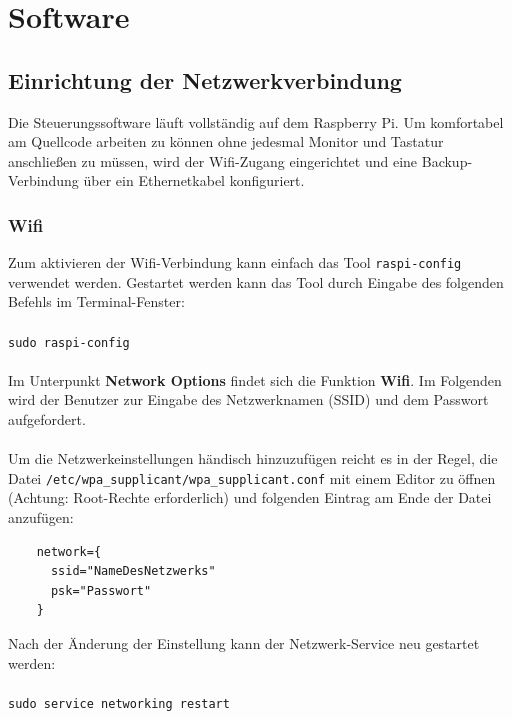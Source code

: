 \section{Software}
  \subsection{Einrichtung der Netzwerkverbindung}
  Die Steuerungssoftware läuft vollständig auf dem Raspberry Pi. Um komfortabel
  am Quellcode arbeiten zu können ohne jedesmal Monitor und Tastatur anschließen
  zu müssen, wird der Wifi-Zugang eingerichtet und eine Backup-Verbindung über
  ein Ethernetkabel konfiguriert. \\

  \subsubsection{Wifi}
    Zum aktivieren der Wifi-Verbindung
    kann einfach das Tool \texttt{raspi-config} verwendet werden. Gestartet
    werden kann das Tool durch Eingabe des folgenden Befehls im
    Terminal-Fenster: \\
    \ \\
    \texttt{sudo raspi-config} \\
    \ \\
    Im Unterpunkt \textbf{Network Options} findet sich die Funktion
    \textbf{Wifi}. Im Folgenden wird der Benutzer zur Eingabe des Netzwerknamen
    (SSID) und dem Passwort aufgefordert. \\
    \ \\
    Um die Netzwerkeinstellungen händisch hinzuzufügen reicht es in der Regel, die
    Datei \texttt{/etc/wpa\_supplicant/wpa\_supplicant.conf} mit einem Editor zu
    öffnen (Achtung: Root-Rechte erforderlich) und folgenden Eintrag am Ende der
    Datei anzufügen:

    \begin{lstlisting}
    network={
      ssid="NameDesNetzwerks"
      psk="Passwort"
    }
    \end{lstlisting}
    \vspace{0.5cm}

    \noindent
    Nach der Änderung der Einstellung kann der Netzwerk-Service neu gestartet
    werden: \\
    \ \\
    \texttt{sudo service networking restart} \\
    \ \\

